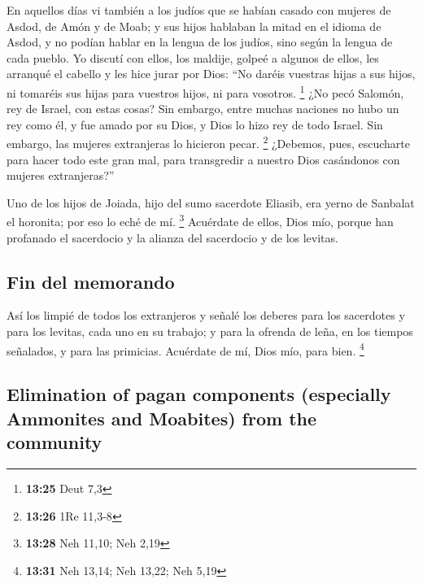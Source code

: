 \begin{paracol}{2}
 En aquellos días vi también a los judíos que se habían
casado con mujeres de Asdod, de Amón y de Moab;  y sus
hijos hablaban la mitad en el idioma de Asdod, y no podían hablar en la
lengua de los judíos, sino según la lengua de cada pueblo.
 Yo discutí con ellos, los maldije, golpeé a algunos de
ellos, les arranqué el cabello y les hice jurar por Dios: ``No daréis
vuestras hijas a sus hijos, ni tomaréis sus hijas para vuestros hijos,
ni para vosotros. \footnote{\textbf{13:25} Deut 7,3}  ¿No
pecó Salomón, rey de Israel, con estas cosas? Sin embargo, entre muchas
naciones no hubo un rey como él, y fue amado por su Dios, y Dios lo hizo
rey de todo Israel. Sin embargo, las mujeres extranjeras lo hicieron
pecar. \footnote{\textbf{13:26} 1Re 11,3-8}  ¿Debemos,
pues, escucharte para hacer todo este gran mal, para transgredir a
nuestro Dios casándonos con mujeres extranjeras?''

 Uno de los hijos de Joiada, hijo del sumo sacerdote
Eliasib, era yerno de Sanbalat el horonita; por eso lo eché de mí.
\footnote{\textbf{13:28} Neh 11,10; Neh 2,19}  Acuérdate
de ellos, Dios mío, porque han profanado el sacerdocio y la alianza del
sacerdocio y de los levitas.

\hypertarget{fin-del-memorando}{%
\subsection{Fin del memorando}\label{fin-del-memorando}}

 Así los limpié de todos los extranjeros y señalé los
deberes para los sacerdotes y para los levitas, cada uno en su trabajo;
 y para la ofrenda de leña, en los tiempos señalados, y
para las primicias. Acuérdate de mí, Dios mío, para bien. \footnote{\textbf{13:31}
  Neh 13,14; Neh 13,22; Neh 5,19} \switchcolumn
\begin{otherlanguage}{english}

\hypertarget{elimination-of-pagan-components-especially-ammonites-and-moabites-from-the-community}{%
\subsection{Elimination of pagan components (especially Ammonites and
Moabites) from the
community}\label{elimination-of-pagan-components-especially-ammonites-and-moabites-from-the-community}}

\hypertarget{section-25}{%
}
\end{otherlanguage}
\end{paracol}
